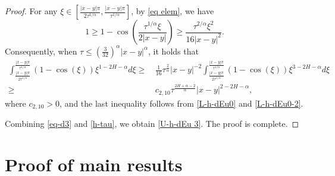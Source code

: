 \documentclass[11pt,reqno]{amsart}
\numberwithin{equation}{section}
\newcommand{\1}{{\bf 1}}
\newcommand{\2}{{\bf 2}}
\begin{document}
\begin{proof}
For any  $  \xi \in  \left[\frac{|x-y|\pi}{2\tau^{1/\alpha}},  \frac{|x-y|\pi}{\tau^{1/\alpha}} \right]$, by \eqref{eq elem},  we have
    \[
  1 \ge    1 - \cos\left(\frac{\tau^{1/\alpha}\xi}{2|x-y|}\right) \ge \frac{\tau^{2/\alpha}\xi^2}{16|x-y|^2}.
    \]
    Consequently, when $\tau \leq \left(\frac{3}{32}\right)^\alpha   |x-y|^{\alpha}$, it holds that
     \begin{equation}\label{h-tau}
\begin{split}
   \int_{\frac{|x-y|\pi}{2\tau^{1/\alpha}}}^{\frac{|x-y|\pi}{\tau^{1/\alpha}}} \left( 1-\cos(\xi)\right) \xi^{1-2H-\alpha}d\xi
\ge &\,  \frac{1}{16}\tau^{\frac{2}{\alpha}}|x-y|^{-2}
\int_{\frac{|x-y|\pi}{2\tau^{1/\alpha}}}^{\frac{|x-y|\pi}{\tau^{1/\alpha}}}
\left( 1-\cos(\xi)\right) \xi^{3-2H-\alpha}d\xi\\
\geq&\, c_{2,10} \tau^{\frac{2H+\alpha-2}{\alpha}}|x-y|^{2-2H-\alpha},
      \end{split}
\end{equation}
   where $c_{2,10}>0$, and the last inequality follows from \eqref{L-h-dEu0} and \eqref{L-h-dEu0-2}.

Combining \eqref{eq-d3} and \eqref{h-tau}, we obtain \eqref{U-h-dEu 3}. The proof is complete.
 \end{proof}


\section{Proof of main results}
\end{document}
